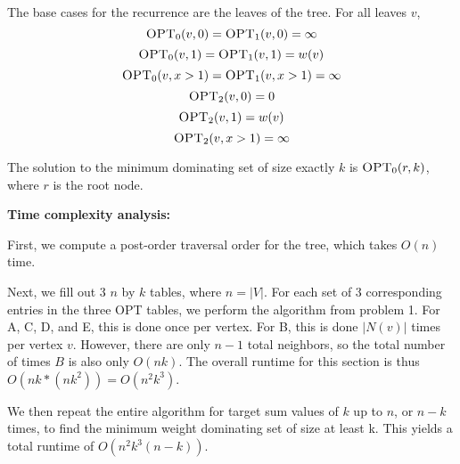 \documentclass{article}
\begin{document}
The base cases for the recurrence are the leaves of the tree. For all leaves
$v$,
$$\textsc{OPT}_0(v,0) = \textsc{OPT}_1(v,0) = \infty$$
$$\textsc{OPT}_0(v,1) = \textsc{OPT}_1(v,1) = w(v)$$
$$\textsc{OPT}_0(v,x > 1) = \textsc{OPT}_1(v, x > 1) = \infty$$
$$\textsc{OPT}_2(v,0) = 0$$
$$\textsc{OPT}_2(v,1) = w(v)$$
$$\textsc{OPT}_2(v, x > 1) = \infty$$


The solution to the minimum dominating set of size exactly $k$ is
$\textsc{OPT}_0(r,k)$, where $r$ is the root node.

\textbf{Time complexity analysis:}

First, we compute a post-order traversal order for the tree, which takes
$O(n)$ time. 

Next, we fill out 3 $n$ by $k$ tables, where $n = |V|$. For each set of 3
corresponding entries in the three \textsc{OPT} tables, we perform the
algorithm from problem 1. For A, C, D, and E, this is done once per vertex. For B, this is done $|N(v)|$
times per vertex $v$. However, there are only $n-1$ total neighbors, so the
total number of times $B$ is also only $O(nk)$. The overall runtime for this
section is thus $O(nk*(nk^2)) = O(n^2k^3)$.

We then repeat the entire algorithm for target sum values of
$k$ up to $n$, or $n - k$ times, to find the minimum weight dominating set of size at least k.
This yields a total runtime of $O(n^2k^3(n-k))$.
\end{document}
